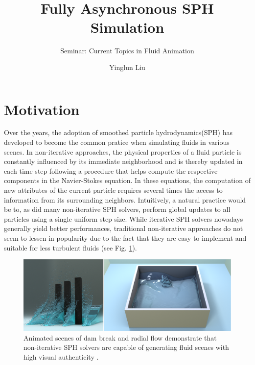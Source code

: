 \documentclass[
	11pt, 
	DIV10,
	ngerman,
	a4paper, 
	oneside, 
	headings=normal, 
	captions=tableheading,
	final, 
	numbers=noenddot
]{scrartcl}
\title{Fully Asynchronous SPH Simulation}
\subtitle{\vspace{0.5cm}Seminar: Current Topics in Fluid Animation}
\author{Yinglun Liu}
\begin{document}
\maketitle


\section{Motivation}

Over the years, the adoption of smoothed particle hydrodynamics(SPH) has developed to become the common pratice when simulating fluids in various scenes. In non-iterative approaches, the physical properties of a fluid particle is constantly influenced by its immediate neighborhood and is thereby updated in each time step following a procedure that helps compute the respective components in the Navier-Stokes equation. In these equations, the computation of new attributes of the current particle requires several times the access to information from its surrounding neighbors. Intuitively, a natural practice would be to, as did many non-iterative SPH solvers, perform global updates to all particles using a single uniform step size. While iterative SPH solvers nowadays generally yield better performances, traditional non-iterative approaches do not seem to lessen in popularity due to the fact that they are easy to implement and suitable for less turbulent fluids (see Fig. \ref{fig1}).

\begin{figure}[tb]
	\centering
	\includegraphics[scale=0.2]{images/3}
	\caption{\label{fig1} Animated scenes of dam break and radial flow demonstrate that non-iterative SPH solvers are capable of generating fluid scenes with high visual authenticity \cite{reinhardt2017fully}.
	}
\end{figure}
\end{document}

